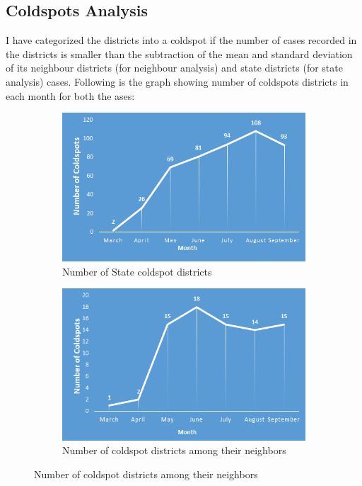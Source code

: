 \documentclass{article}
\begin{document}
\subsection{Coldspots Analysis}
I have categorized the districts into a coldspot if the number of cases recorded in the districts is smaller than the subtraction of the mean and standard deviation of its neighbour districts (for neighbour analysis) and state districts (for state analysis) cases. Following is the graph showing number of coldspots districts in each month for both the ases:
\begin{figure}[!h] 
    \centering
	\begin{subfigure}[b]{7cm} 
		\centering 
		\includegraphics[scale=0.74]{images/neighbour-month-coldspots.png}
		\caption{Number of State coldspot districts} 
	\end{subfigure} 
	\hspace{0cm} 
	\begin{subfigure}[b]{8cm} 
		\centering 
		\includegraphics[scale=0.7]{images/sate-month-coldspots.png}
		\caption{Number of coldspot districts among their neighbors} 
	\end{subfigure} 
\end{figure}
\end{document}
